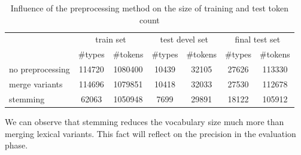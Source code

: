 \begin{table}[h!]
\begin{tabular}{ l | c c | c c | c c|}
& \multicolumn{2}{|c}{train set} & \multicolumn{2}{|c}{test devel set} & \multicolumn{2}{|c|}{final test set} \\
   &  \#types & \#tokens  &  \#types & \#tokens  &  \#types & \#tokens \\
  \hline                       
  no preprocessing & 114720 & 1080400 & 10439 & 32105 & 27626 & 113330\\
  merge variants & 114696 & 1079851 & 10418 &  32033 & 27530 &112678\\
  stemming & 62063 & 1050948 & 7699 & 29891 & 18122 & 105912\\
\end{tabular}
\caption{Influence of the preprocessing method on the size of training and test token count}
\end{table}
We can observe that stemming reduces the vocabulary size much more than merging 
lexical variants. This fact will reflect on the precision in the evaluation phase. 

